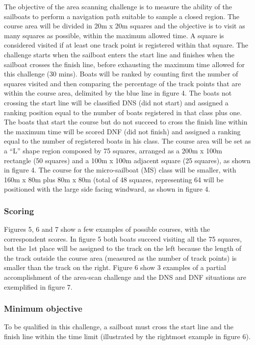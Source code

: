 \documentclass[12pt]{article}
\begin{document}
The objective of the area scanning challenge is to measure the ability of the
sailboats to perform
a navigation path suitable to sample a closed region. The course area will be
divided in 20m x
20m squares and the objective is to visit as many squares as possible, within
the maximum
allowed time. A square is considered visited if at least one track point is
registered within that
square.
The challenge starts when the sailboat enters the start line and finishes when
the sailboat
crosses the finish line, before exhausting the maximum time allowed for this
challenge (30
mins). Boats will be ranked by counting first the number of squares visited and
then comparing the percentage of the track points that are within the course
area, delimited by the
blue line in figure 4. The boats not crossing the start line will be classified
DNS (did not start)
and assigned a ranking position equal to the number of boats registered in that
class plus one.
The boats that start the course but do not succeed to cross the finish line
within the maximum
time will be scored DNF (did not finish) and assigned a ranking equal to the
number of registered
boats in his class. The course area will be set as a “L” shape region composed
by 75 squares, arranged as a 200m
x 100m rectangle (50 squares) and a 100m x 100m adjacent square (25 squares), as
shown in
figure 4. The course for the micro-sailboat (MS) class will be smaller, with
160m x 80m plus 80m
x 80m (total of 48 squares, representing 64%
will be positioned
with the large side facing windward, as shown in figure 4.

\subsubsection{Scoring}

Figures 5, 6 and 7 show a few examples of possible courses, with the
correspondent scores. In
figure 5 both boats succeed visiting all the 75 squares, but the 1st place will
be assigned to the
track on the left because the length of the track outside the course area
(measured as the
number of track points) is smaller than the track on the right. Figure 6 show 3
examples of a
partial accomplishment of the area-scan challenge and the DNS and DNF situations
are
exemplified in figure 7.

\subsubsection{Minimum objective}
To be qualified in this challenge, a sailboat must cross the start line and the
finish line within
the time limit (illustrated by the rightmost example in figure 6).
\end{document}
